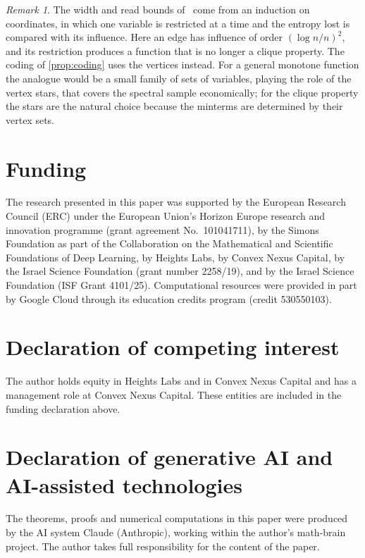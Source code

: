 \documentclass[11pt]{amsart}
\theoremstyle{remark}
\newtheorem{remark}[theorem]{Remark}
\begin{document}
\begin{remark}
The width and read bounds of~\cite{Shm26a,Shm26b} come from an induction on coordinates, in which one variable is
restricted at a time and the entropy lost is compared with its influence. Here an edge has influence of order
$(\log n/n)^2$, and its restriction produces a function that is no longer a clique property. The coding of
\cref{prop:coding} uses the vertices instead. For a general monotone function the analogue would be a small family of
sets of variables, playing the role of the vertex stars, that covers the spectral sample economically; for the clique
property the stars are the natural choice because the minterms are determined by their vertex sets.
\end{remark}

\section*{Funding}
The research presented in this paper was supported by the European Research Council (ERC) under the European
Union's Horizon Europe research and innovation programme (grant agreement No.~101041711), by the Simons Foundation
as part of the Collaboration on the Mathematical and Scientific Foundations of Deep Learning, by Heights Labs, by
Convex Nexus Capital, by the Israel Science Foundation (grant number 2258/19), and by the Israel Science Foundation
(ISF Grant 4101/25). Computational resources were provided in part by Google Cloud through its education credits
program (credit 530550103).

\section*{Declaration of competing interest}
The author holds equity in Heights Labs and in Convex Nexus Capital and has a management role at Convex Nexus
Capital. These entities are included in the funding declaration above.

\section*{Declaration of generative AI and AI-assisted technologies}
The theorems, proofs and numerical computations in this paper were produced by the AI system Claude (Anthropic),
working within the author's math-brain project. The author takes full responsibility for the content of the paper.
\end{document}
